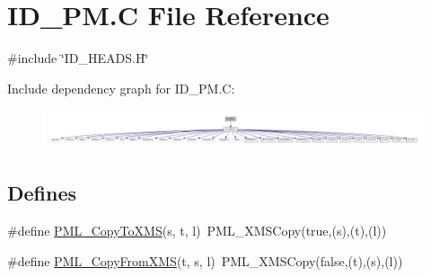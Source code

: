 \hypertarget{ID__PM_8C}{
\section{ID\_\-PM.C File Reference}
\label{ID__PM_8C}
}
{\ttfamily \#include \char`\"{}ID\_\-HEADS.H\char`\"{}}\par
Include dependency graph for ID\_\-PM.C:
\nopagebreak
\begin{figure}[H]
\begin{center}
\leavevmode
\includegraphics[width=400pt]{ID__PM_8C__incl}
\end{center}
\end{figure}
\subsection*{Defines}
\begin{DoxyCompactItemize}
\item 
\#define \hyperlink{ID__PM_8C_ae786623d35b6f789a1e6ddc4b43da346}{PML\_\-CopyToXMS}(s, t, l)~PML\_\-XMSCopy(true,(s),(t),(l))
\item 
\#define \hyperlink{ID__PM_8C_a902ce8cb3f1c419695a053f1c8c3b223}{PML\_\-CopyFromXMS}(t, s, l)~PML\_\-XMSCopy(false,(t),(s),(l))
\end{DoxyCompactItemize}

